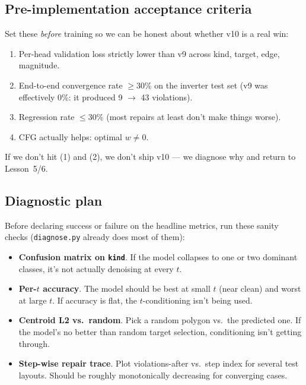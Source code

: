 \documentclass[11pt,a4paper]{article}
\begin{document}
\subsection{Pre-implementation acceptance criteria}

Set these \emph{before} training so we can be honest about whether v10
is a real win:

\begin{tcolorbox}[colback=gray!5,colframe=black,title=\textbf{v10 success criteria}]
\begin{enumerate}[leftmargin=*]
\item Per-head validation loss strictly lower than v9 across kind,
  target, edge, magnitude.
\item End-to-end convergence rate $\geq 30\%$ on the inverter test set
  (v9 was effectively 0\%: it produced 9 $\to$ 43 violations).
\item Regression rate $\leq 30\%$ (most repairs at least don't make
  things worse).
\item CFG actually helps: optimal $w \neq 0$.
\end{enumerate}
\end{tcolorbox}

If we don't hit (1) and (2), we don't ship v10 --- we diagnose why and
return to Lesson~5/6.

\subsection{Diagnostic plan}

Before declaring success or failure on the headline metrics, run these
sanity checks (\texttt{diagnose.py} already does most of them):

\begin{itemize}[leftmargin=*]
\item \textbf{Confusion matrix on \texttt{kind}}. If the model collapses
  to one or two dominant classes, it's not actually denoising at every $t$.
\item \textbf{Per-$t$ accuracy}. The model should be best at small $t$
  (near clean) and worst at large $t$. If accuracy is flat, the
  $t$-conditioning isn't being used.
\item \textbf{Centroid L2 vs.\ random}. Pick a random polygon vs.\ the
  predicted one. If the model's no better than random target selection,
  conditioning isn't getting through.
\item \textbf{Step-wise repair trace}. Plot violations-after vs.\ step
  index for several test layouts. Should be roughly monotonically
  decreasing for converging cases.
\end{itemize}
\end{document}
